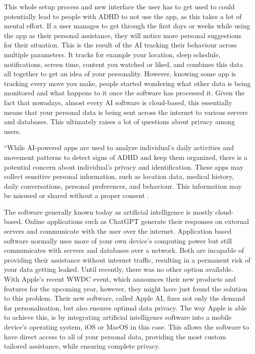 \documentclass[english]{hogent-article}
\begin{document}
This whole setup process and new interface the user has to get used to could potentially lead to people with ADHD to not use the app, as this takes a lot of mental effort. If a user manages to get through the first days or weeks while using the app as their personal assistance, they will notice more personal suggestions for their situation. This is the result of the AI tracking their behaviour across multiple parameters. It tracks for example your location, sleep schedule, notifications, screen time, content you watched or liked, and combines this data all together to get an idea of your personality. However, knowing some app is tracking every move you make, people started wondering what other data is being monitored and what happens to it once the software has processed it. Given the fact that nowadays, almost every AI software is cloud-based, this essentially means that your personal data is being sent across the internet to various servers and databases. This ultimately raises a lot of questions about privacy among users.

“While AI-powered apps are used to analyze individual’s daily activities and movement patterns to detect signs of ADHD and keep them organized, there is a potential concern about individual’s privacy and identification. These apps may collect sensitive personal information, such as location data, medical history, daily conversations, personal preferences, and behaviour. This information may be misused or shared without a proper consent \autocite{Rahman2023}.

The software generally known today as artificial intelligence is mostly cloud-based. Online applications such as ChatGPT generate their responses on external servers and communicate with the user over the internet. Application based software normally uses more of your own device's computing power but still communicates with servers and databases over a network. Both are incapable of providing their assistance without internet traffic, resulting in a permanent risk of your data getting leaked. Until recently, there was no other option available. With Apple's recent WWDC event, which announces their new products and features for the upcoming year, however, they might have just found the solution to this problem. Their new software, called Apple AI, fixes not only the demand for personalisation, but also ensures optimal data privacy. The way Apple is able to achieve this, is by integrating artificial intelligence software into a mobile device's operating system,  iOS or MacOS in this case. This allows the software to have direct access to all of your personal data, providing the most custom tailored assistance, while ensuring complete privacy.
\end{document}
